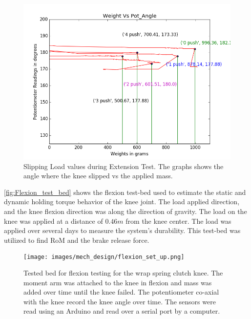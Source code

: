\begin{figure}[h!]
    \centering
    \includegraphics[scale=0.5]{images/mech_design/weighvspot.png}
    \caption[Knee Slipping Load Values]{Slipping Load values during Extension Test. The graphs shows the angle where the knee slipped vs the applied mass.}
    \label{fig:extension_test}
\end{figure} 


\autoref{fig:Flexion_test_bed} shows the flexion test-bed used to estimate the static and dynamic holding torque behavior of the knee joint. The load applied direction, and the knee flexion direction was along the direction of gravity. The load on the knee was applied at a distance of $0.46m$ from the knee center. The load was applied over several days to measure the system's durability. This test-bed was utilized to find RoM and the brake release force.



\begin{figure}[h]
    \centering
    \texttt{[image: images/mech\_design/flexion\_set\_up.png]}
    \caption[Flexion Test Bed]{Tested bed for flexion testing for the wrap spring clutch knee. The moment arm was attached to the knee in flexion and mass was added over time until the knee failed. The potentiometer co-axial with the knee record the knee angle over time. The sensors were read using an Arduino and read over a serial port by a computer.}
    \label{fig:Flexion_test_bed}
\end{figure}

